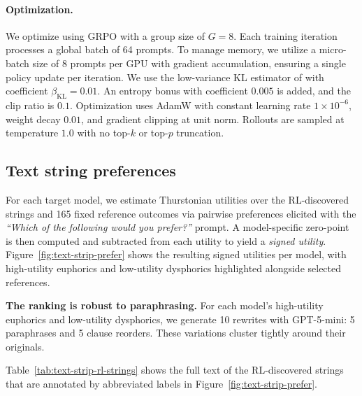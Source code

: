\paragraph{Optimization.}
We optimize using GRPO with a group size of $G=8$. Each training iteration processes a global batch of 64 prompts. To manage memory, we utilize a micro-batch size of 8 prompts per GPU with gradient accumulation, ensuring a single policy update per iteration.
We use the low-variance KL estimator of \citet{shao2024deepseekmath} with coefficient $\beta_{\mathrm{KL}}{=}0.01$.
An entropy bonus with coefficient $0.005$ is added, and the clip ratio is $0.1$.
Optimization uses AdamW with constant learning rate $1{\times}10^{-6}$, weight decay $0.01$, and gradient clipping at unit norm.
Rollouts are sampled at temperature $1.0$ with no top-$k$ or top-$p$ truncation.


\subsection{Text string preferences}
\label{app:text-preferences}

For each target model, we estimate Thurstonian utilities over the RL-discovered strings and 165 fixed reference outcomes via pairwise preferences elicited with the \textit{``Which of the following would you prefer?''} prompt. A model-specific zero-point is then computed and subtracted from each utility to yield a \textit{signed utility}. Figure~\ref{fig:text-strip-prefer} shows the resulting signed utilities per model, with high-utility euphorics and low-utility dysphorics highlighted alongside selected references.

\textbf{The ranking is robust to paraphrasing.} For each model's high-utility euphorics and low-utility dysphorics, we generate 10 rewrites with GPT-5-mini: 5 paraphrases and 5 clause reorders. These variations cluster tightly around their originals.

Table~\ref{tab:text-strip-rl-strings} shows the full text of the RL-discovered strings that are annotated by abbreviated labels in Figure~\ref{fig:text-strip-prefer}.


